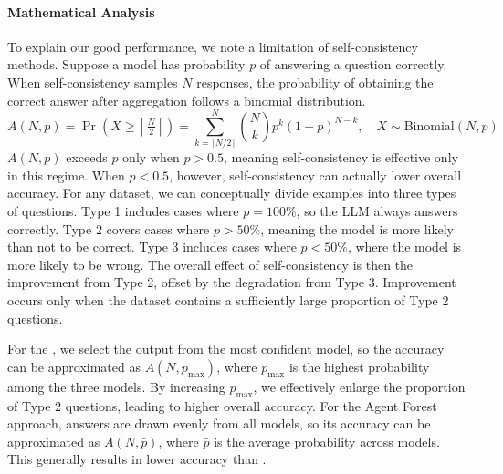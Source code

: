 \vspace{-5pt}
\paragraph{Mathematical Analysis} 


To explain our good performance, we note a limitation of self-consistency methods. Suppose a model has probability $p$ of answering a question correctly. When self-consistency samples $N$ responses, the probability of obtaining the correct answer after aggregation follows a binomial distribution.
% 
\begin{equation*}
A(N, p) = \Pr\left( X \geq \left\lceil \tfrac{N}{2} \right\rceil \right) = \sum_{k=\lceil N/2 \rceil}^{N} \binom{N}{k} p^{k}(1-p)^{N-k}, \quad X \sim \text{Binomial}(N,p)
\end{equation*}
% 
$A(N,p)$ exceeds $p$ only when $p > 0.5$, meaning self-consistency is effective only in this regime. When $p < 0.5$, however, self-consistency can actually lower overall accuracy. For any dataset, we can conceptually divide examples into three types of questions. Type 1 includes cases where $p = 100\%$, so the LLM always answers correctly. Type 2 covers cases where $p > 50\%$, meaning the model is more likely than not to be correct. Type 3 includes cases where $p < 50\%$, where the model is more likely to be wrong. The overall effect of self-consistency is then the improvement from Type 2, offset by the degradation from Type 3. Improvement occurs only when the dataset contains a sufficiently large proportion of Type 2 questions. 

For the \NAME{}, we select the output from the most confident model, so the accuracy can be approximated as $A(N, p_{\max})$, where $p_{\max}$ is the highest probability among the three models. By increasing $p_{\max}$, we effectively enlarge the proportion of Type 2 questions, leading to higher overall accuracy. For the Agent Forest approach, answers are drawn evenly from all models, so its accuracy can be approximated as $A(N, \bar{p})$, where $\bar{p}$ is the average probability across models. This generally results in lower accuracy than \NAME{}.

